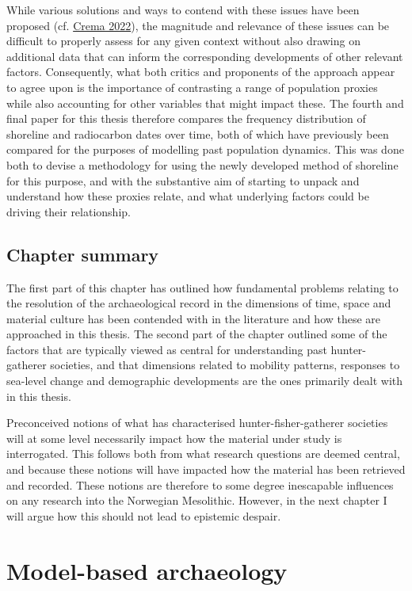 \documentclass[
  12pt,
  a4paper,
  oneside]{book}
\begin{document}
While various solutions and ways to contend with these issues have been proposed (cf. \protect\hyperlink{ref-crema2022}{Crema 2022}), the magnitude and relevance of these issues can be difficult to properly assess for any given context without also drawing on additional data that can inform the corresponding developments of other relevant factors. Consequently, what both critics and proponents of the approach appear to agree upon is the importance of contrasting a range of population proxies while also accounting for other variables that might impact these. The fourth and final paper for this thesis therefore compares the frequency distribution of shoreline and radiocarbon dates over time, both of which have previously been compared for the purposes of modelling past population dynamics. This was done both to devise a methodology for using the newly developed method of shoreline for this purpose, and with the substantive aim of starting to unpack and understand how these proxies relate, and what underlying factors could be driving their relationship.

\hypertarget{chapter-summary-1}{%
\section{Chapter summary}\label{chapter-summary-1}}

The first part of this chapter has outlined how fundamental problems relating to the resolution of the archaeological record in the dimensions of time, space and material culture has been contended with in the literature and how these are approached in this thesis. The second part of the chapter outlined some of the factors that are typically viewed as central for understanding past hunter-gatherer societies, and that dimensions related to mobility patterns, responses to sea-level change and demographic developments are the ones primarily dealt with in this thesis.

Preconceived notions of what has characterised hunter-fisher-gatherer societies will at some level necessarily impact how the material under study is interrogated. This follows both from what research questions are deemed central, and because these notions will have impacted how the material has been retrieved and recorded. These notions are therefore to some degree inescapable influences on any research into the Norwegian Mesolithic. However, in the next chapter I will argue how this should not lead to epistemic despair.

\hypertarget{chapter4}{%
\chapter{Model-based archaeology}\label{chapter4}}
\end{document}

